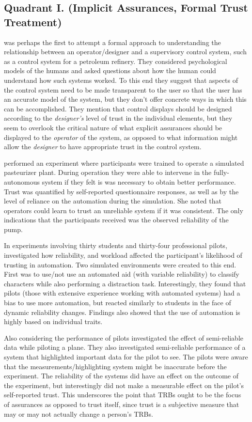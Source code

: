 \subsection{Quadrant I. (Implicit Assurances, Formal Trust Treatment)}\label{sec:q1}
\citet{Sheridan1984-kx} was perhaps the first to attempt a formal approach to understanding the relationship between an operator/designer and a supervisory control system, such as a control system for a petroleum refinery. They considered psychological models of the humans and asked questions about how the human could understand how such systems worked. To this end they suggest that aspects of the control system need to be made transparent to the user so that the user has an accurate model of the system, but they don't offer concrete ways in which this can be accomplished. They mention that control displays should be designed according to the \emph{designer's} level of trust in the individual elements, but they seem to overlook the critical nature of what explicit assurances should be displayed to the \emph{operator} of the system, as opposed to what information might allow the \emph{designer} to have appropriate trust in the control system.

\citet{Muir1996-gt} performed an experiment where participants were trained to operate a simulated pasteurizer plant. During operation they were able to intervene in the fully-autonomous system if they felt is was necessary to obtain better performance. Trust was quantified by self-reported questionnaire responses, as well as by the level of reliance on the automation during the simulation. She noted that operators could learn to trust an unreliable system if it was consistent. The only indications that the participants received was the observed reliability of the pump. 

In experiments involving thirty students and thirty-four professional pilots, \citet{Riley1996-qm} investigated how reliability, and workload affected the participant's likelihood of trusting in automation. Two simulated environments were created to this end. First was to use/not use an automated aid (with variable reliability) to classify characters while also performing a distraction task. Interestingly, they found that pilots (those with extensive experience working with automated systems) had a bias to use more automation, but reacted similarly to students in the face of dynamic reliability changes. Findings also showed that the use of automation is highly based on individual traits.

Also considering the performance of pilots \citet{Wickens1999-la} investigated the effect of semi-reliable data while piloting a plane. They also investigated semi-reliable performance of a system that highlighted important data for the pilot to see. The pilots were aware that the measurements/highlighting system might be inaccurate before the experiment. The reliability of the systems did have an effect on the outcome of the experiment, but interestingly did not make a measurable effect on the pilot's self-reported trust. This underscores the point that TRBs ought to be the focus of assurances as opposed to trust itself, since trust is a subjective measure that may or may not actually change a person's TRBs.

